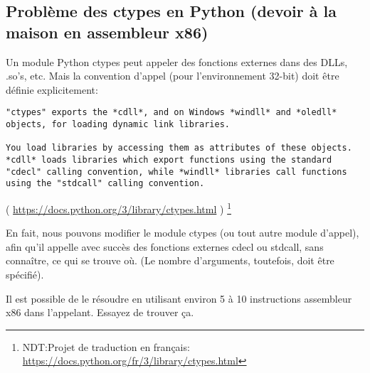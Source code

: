 \subsection{Problème des ctypes en Python (devoir à la maison en assembleur x86)}

Un module Python ctypes peut appeler des fonctions externes dans des DLLs, .so's, etc.
Mais la convention d'appel (pour l'environnement 32-bit) doit être définie explicitement:

\begin{lstlisting}
"ctypes" exports the *cdll*, and on Windows *windll* and *oledll*
objects, for loading dynamic link libraries.

You load libraries by accessing them as attributes of these objects.
*cdll* loads libraries which export functions using the standard
"cdecl" calling convention, while *windll* libraries call functions
using the "stdcall" calling convention.
\end{lstlisting}
( \url{https://docs.python.org/3/library/ctypes.html} )%
\footnote{NDT:Projet de traduction en français: \url{https://docs.python.org/fr/3/library/ctypes.html} }

En fait, nous pouvons modifier le module ctypes (ou tout autre module d'appel),
afin qu'il appelle avec succès des fonctions externes cdecl ou stdcall, sans
connaître, ce qui se trouve où.
(Le nombre d'arguments, toutefois, doit être spécifié).

Il est possible de le résoudre en utilisant environ 5 à 10 instructions assembleur
x86 dans l'appelant.
Essayez de trouver ça.


